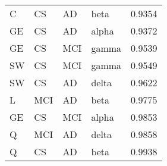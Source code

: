 \begin{center}
\begin{longtable}{|l|l|l|l|l|}
					C  & CS  & AD  & beta  & 0.9354 \\
					GE & CS  & AD  & alpha & 0.9372 \\
					GE & CS  & MCI & gamma & 0.9539 \\
					SW & CS  & MCI & gamma & 0.9549 \\
					SW & CS  & AD  & delta & 0.9622 \\
					L  & MCI & AD  & beta  & 0.9775 \\
					GE & CS  & MCI & alpha & 0.9853 \\
					Q  & MCI & AD  & delta & 0.9858 \\
					Q  & CS  & AD  & beta  & 0.9938 \\
				\end{longtable}
			\end{center}